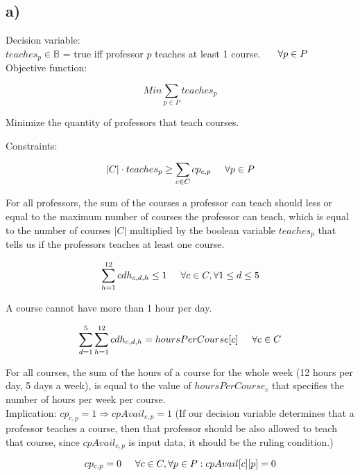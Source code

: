 \documentclass[11pt, oneside]{article}   	%
\begin{document}
\subsection{a)}

\hspace{\parindent}Decision variable:\\

$teaches_p \in \mathbb{B}$ = true iff professor $p$ teaches at least 1 course. $\hspace{5 mm} \forall p \in P$\\

Objective function:

$$Min \sum_{p \in P} teaches_p$$

Minimize the quantity of professors that teach courses.

Constraints:

$$|C| \cdot teaches_p \geq \sum_{c \in C} cp_{c,p} \hspace{5 mm} \forall p \in P$$

For all professors, the sum of the courses a professor can teach should less or equal to the maximum number of courses the professor can teach, which is equal to the number of courses $|C|$ multiplied by the boolean variable $teaches_p$ that tells us if the professors teaches at least one course.

$$\sum_{h = 1}^{12} cdh_{c,d,h} \leq 1\hspace{5 mm} \forall c \in C, \forall 1 \leq d \leq 5$$

A course cannot have more than 1 hour per day.

$$\sum_{d = 1}^5 \sum_{h = 1}^{12} cdh_{c,d,h} = hoursPerCourse[c] \hspace{5 mm} \forall c \in C$$

For all courses, the sum of the hours of a course for the whole week (12 hours per day, 5 days a week), is equal to the value of $hoursPerCourse_c$ that specifies the number of hours per week per course.\\

Implication: $cp_{c,p} = 1 \Longrightarrow cpAvail_{c,p} = 1$ (If our decision variable determines that a professor teaches a course, then that professor should be also allowed to teach that course, since $cpAvail_{c,p}$ is input data, it should be the ruling condition.)

$$cp_{c,p} = 0 \hspace{5 mm} \forall c \in C, \forall p \in P : cpAvail[c][p] = 0$$
\end{document}
